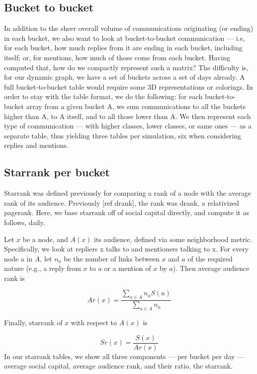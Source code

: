 \documentclass[10pt,oneside]{memoir}
\begin{document}
\subsection{Bucket to bucket}
\label{buckettobucket}

In addition to the sheer overall volume of communications originating (or ending) in each bucket, we also want to look at bucket-to-bucket communication --- i.e, for each bucket, how much replies from it are ending in each bucket, including itself; or, for mentions, how much of those come from each bucket.
Having computed that, how do we compactly represent such a matrix?  The difficulty is, for our dynamic graph, we have a set of buckets across a set of days already.  A full bucket-to-bucket table would require some 3D representations or colorings.  In order to stay with the table format, we do the following: for each bucket-to-bucket array from a given bucket A, we sum communications to all the buckets higher than A, to A itself, and to all those lower than A.  We then represent each type of communication --- with higher classes, lower classes, or same ones --- as a separate table, thus yielding three tables per simulation, six when considering replies and mentions.


\subsection{Starrank per bucket}
\label{starrankperbucket}

Starrank was defined previously for comparing a rank of a node with the average rank of its audience.  Previously [ref drank], the rank was drank, a relativized pagerank.  Here, we base starrank off of social capital directly, and compute it as follows, daily.



Let $x$ be a node, and $A(x)$ its audience, defined via some neighborhood metric.  Specifically, we look at repliers x talks to and mentioners talking to x.  For every node a in $A$, let $n_a$ be the number of links between $x$ and $a$ of the required nature (e.g., a reply from $x$ to $a$ or a mention of $x$ by $a$).  Then average audience rank is

\[ Ar(x) = \frac{\sum_{a \in A} n_a S(a)}{\sum_{a \in A} n_a} \]

Finally, starrank of $x$ with respect to $A(x)$ is

\[ Sr(x) = \frac{S(x)}{Ar(x)} \]
In our starrank tables, we show all three components --- per bucket per day --- average social capital, average audience rank, and their ratio, the starrank.
\end{document}
